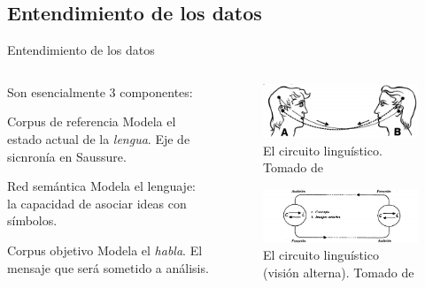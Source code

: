 \documentclass[presentation]{beamer}
\begin{document}
\subsection{Entendimiento de los datos}
\label{sec:org1c6085b}
\begin{frame}[label={sec:orgdbb1f81}]{Entendimiento de los datos}
\begin{columns}
\begin{column}{0.48\columnwidth}
Son esencialmente 3 componentes:

\begin{block}{Corpus de referencia}
Modela el estado actual de la \emph{lengua}.
Eje de sicnronía en Saussure.
\end{block}

\begin{block}{Red semántica}
 Modela el lenguaje: la capacidad de asociar ideas con símbolos.
\end{block}

\begin{block}{Corpus objetivo}
 Modela el \emph{habla}. El mensaje que será sometido a análisis.
\end{block}
\end{column}



\begin{column}{0.48\columnwidth}
\begin{figure}
\includegraphics[width=\textwidth]{./assets/sistema-comunicacion.png}
\caption{El circuito linguístico. Tomado de \cite{alonso1945curso}}
\end{figure}

   \begin{figure}

   \includegraphics[width=\textwidth]{./assets/sistema-comunicacion2.png}
\caption{El circuito linguístico (visión alterna). Tomado de \cite{alonso1945curso}}
   \end{figure}
\end{column}
\end{columns}
\end{frame}
\end{document}
